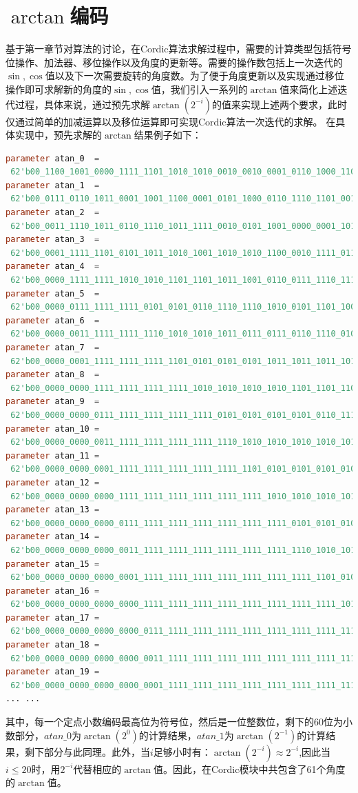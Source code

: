 \documentclass[a4paper,12pt]{report}
\begin{document}
\section{$\arctan$编码}
基于第一章节对算法的讨论，在Cordic算法求解过程中，需要的计算类型包括符号位操作、加法器、移位操作以及角度的更新等。需要的操作数包括上一次迭代的$\sin, \cos$值以及下一次需要旋转的角度数。为了便于角度更新以及实现通过移位操作即可求解新的角度的$\sin, \cos$值，我们引入一系列的$\arctan$值来简化上述迭代过程，具体来说，通过预先求解$\arctan(2^{-i})$的值来实现上述两个要求，此时仅通过简单的加减运算以及移位运算即可实现Cordic算法一次迭代的求解。
在具体实现中，预先求解的$\arctan$结果例子如下：
{
\footnotesize
\begin{lstlisting}[language=Verilog]
parameter atan_0  =
 62'b00_1100_1001_0000_1111_1101_1010_1010_0010_0010_0001_0110_1000_1100_0000_0000;
parameter atan_1  =
 62'b00_0111_0110_1011_0001_1001_1100_0001_0101_1000_0110_1110_1101_0011_1100_0000;
parameter atan_2  =
 62'b00_0011_1110_1011_0110_1110_1011_1111_0010_0101_1001_0000_0001_1011_1010_0000;
parameter atan_3  =
 62'b00_0001_1111_1101_0101_1011_1010_1001_1010_1010_1100_0010_1111_0110_1110_0000;
parameter atan_4  =
 62'b00_0000_1111_1111_1010_1010_1101_1101_1011_1001_0110_0111_1110_1111_0101_0000;
parameter atan_5  =
 62'b00_0000_0111_1111_1111_0101_0101_0110_1110_1110_1010_0101_1101_1000_1001_0100;
parameter atan_6  =
 62'b00_0000_0011_1111_1111_1110_1010_1010_1011_0111_0111_0110_1110_0101_0011_0110;
parameter atan_7  =
 62'b00_0000_0001_1111_1111_1111_1101_0101_0101_0101_1011_1011_1011_1010_1001_0111;
parameter atan_8  =
 62'b00_0000_0000_1111_1111_1111_1111_1010_1010_1010_1010_1101_1101_1101_1101_1100;
parameter atan_9  =
 62'b00_0000_0000_0111_1111_1111_1111_1111_0101_0101_0101_0101_0110_1110_1110_1111;
parameter atan_10 =
 62'b00_0000_0000_0011_1111_1111_1111_1111_1110_1010_1010_1010_1010_1011_0111_1000;
parameter atan_11 =
 62'b00_0000_0000_0001_1111_1111_1111_1111_1111_1101_0101_0101_0101_0101_0101_1100;
parameter atan_12 =
 62'b00_0000_0000_0000_1111_1111_1111_1111_1111_1111_1010_1010_1010_1010_1010_1011;
parameter atan_13 =
 62'b00_0000_0000_0000_0111_1111_1111_1111_1111_1111_1111_0101_0101_0101_0101_0101;
parameter atan_14 =
 62'b00_0000_0000_0000_0011_1111_1111_1111_1111_1111_1111_1110_1010_1010_1010_1011;
parameter atan_15 =
 62'b00_0000_0000_0000_0001_1111_1111_1111_1111_1111_1111_1111_1101_0101_0101_0101;
parameter atan_16 =
 62'b00_0000_0000_0000_0000_1111_1111_1111_1111_1111_1111_1111_1111_1010_1010_1011;
parameter atan_17 =
 62'b00_0000_0000_0000_0000_0111_1111_1111_1111_1111_1111_1111_1111_1111_0101_0101;
parameter atan_18 =
 62'b00_0000_0000_0000_0000_0011_1111_1111_1111_1111_1111_1111_1111_1111_1110_1011;
parameter atan_19 =
 62'b00_0000_0000_0000_0000_0001_1111_1111_1111_1111_1111_1111_1111_1111_1111_1101;
... ...
\end{lstlisting}
}
其中，每一个定点小数编码最高位为符号位，然后是一位整数位，剩下的60位为小数部分，$atan\_0$为$\arctan(2^0)$的计算结果，$atan\_1$为$\arctan(2^{-1})$的计算结果，剩下部分与此同理。此外，当$i$足够小时有：$\arctan(2^{-i}) \approx 2^{-i}$,因此当$i \le 20$时，用$2^{-i}$代替相应的$\arctan$值。因此，在Cordic模块中共包含了61个角度的$\arctan$值。
\end{document}
